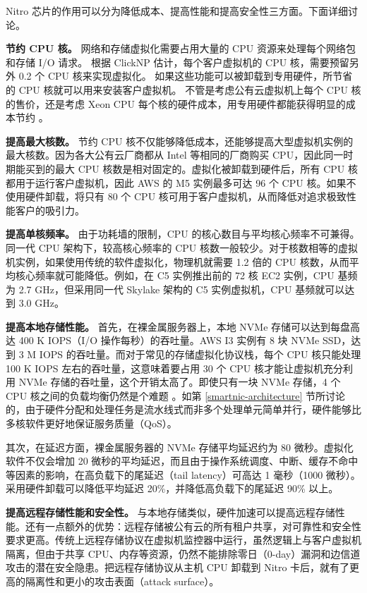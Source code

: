 Nitro 芯片的作用可以分为降低成本、提高性能和提高安全性三方面。下面详细讨论。

\textbf{节约 CPU 核。}
网络和存储虚拟化需要占用大量的 CPU 资源来处理每个网络包和存储 I/O 请求。
根据 ClickNP \cite{li2016clicknp} 估计，每个客户虚拟机的 CPU 核，需要预留另外 0.2 个 CPU 核来实现虚拟化。
如果这些功能可以被卸载到专用硬件，所节省的 CPU 核就可以用来安装客户虚拟机。
不管是考虑公有云虚拟机上每个 CPU 核的售价，还是考虑 Xeon CPU 每个核的硬件成本，用专用硬件都能获得明显的成本节约 \cite{smartnic}。

\textbf{提高最大核数。}
节约 CPU 核不仅能够降低成本，还能够提高大型虚拟机实例的最大核数。因为各大公有云厂商都从 Intel 等相同的厂商购买 CPU，因此同一时期能买到的最大 CPU 核数是相对固定的。虚拟化被卸载到硬件后，所有 CPU 核都用于运行客户虚拟机，因此 AWS 的 M5 实例最多可达 96 个 CPU 核。如果不使用硬件卸载，将只有 80 个 CPU 核可用于客户虚拟机，从而降低对追求极致性能客户的吸引力。

\textbf{提高单核频率。}
由于功耗墙的限制，CPU 的核心数目与平均核心频率不可兼得。同一代 CPU 架构下，较高核心频率的 CPU 核数一般较少。对于核数相等的虚拟机实例，如果使用传统的软件虚拟化，物理机就需要 1.2 倍的 CPU 核数，从而平均核心频率就可能降低。例如，在 C5 实例推出前的 72 核 EC2 实例，CPU 基频为 2.7 GHz，但采用同一代 Skylake 架构的 C5 实例虚拟机，CPU 基频就可以达到 3.0 GHz。

\textbf{提高本地存储性能。}
首先，在裸金属服务器上，本地 NVMe 存储可以达到每盘高达 400 K IOPS（I/O 操作每秒）的吞吐量。AWS I3 实例有 8 块 NVMe SSD，达到 3 M IOPS 的吞吐量。而对于常见的存储虚拟化协议栈，每个 CPU 核只能处理 100 K IOPS 左右的吞吐量，这意味着要占用 30 个 CPU 核才能让虚拟机充分利用 NVMe 存储的吞吐量，这个开销太高了。即使只有一块 NVMe 存储，4 个 CPU 核之间的负载均衡仍然是个难题 \cite{li2017kv}。如第 \ref{smartnic-architecture} 节所讨论的，由于硬件分配和处理任务是流水线式而非多个处理单元简单并行，硬件能够比多核软件更好地保证服务质量（QoS）。

其次，在延迟方面，裸金属服务器的 NVMe 存储平均延迟约为 80 微秒。虚拟化软件不仅会增加 20 微秒的平均延迟，而且由于操作系统调度、中断、缓存不命中等因素的影响，在高负载下的尾延迟（tail latency）可高达 1 毫秒（1000 微秒）。采用硬件卸载可以降低平均延迟 20\%，并降低高负载下的尾延迟 90\% 以上。

\textbf{提高远程存储性能和安全性。}
与本地存储类似，硬件加速可以提高远程存储性能。还有一点额外的优势：远程存储被公有云的所有租户共享，对可靠性和安全性要求更高。传统上远程存储协议在虚拟机监控器中运行，虽然逻辑上与客户虚拟机隔离，但由于共享 CPU、内存等资源，仍然不能排除零日（0-day）漏洞和边信道攻击的潜在安全隐患。把远程存储协议从主机 CPU 卸载到 Nitro 卡后，就有了更高的隔离性和更小的攻击表面（attack surface）。

